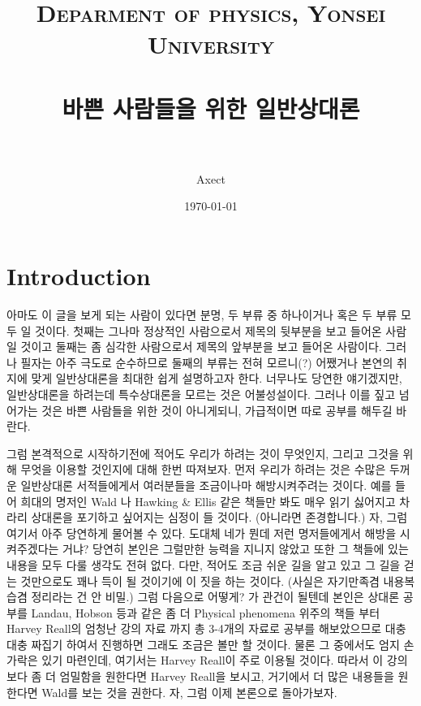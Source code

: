 \documentclass[final]{IEEEphot} %
\title{	
\normalsize 
\textsc{Deparment of physics, Yonsei University} \\ [25pt] %
\horrule{0.5pt} \\[0.4cm] %
\huge 바쁜 사람들을 위한 일반상대론\\ %
\horrule{2pt} \\[0.5cm] %
}
\author{Axect} %
\date{\normalsize\today} %
\numberwithin{equation}{section} %
\numberwithin{figure}{section} %
\numberwithin{table}{section} %
\theoremstyle{plain}
\newcommand{\HS}{\hspace{0.5cm}}
\begin{document}
\maketitle %


\section{Introduction}

\onehalfspacing
\HS 아마도 이 글을 보게 되는 사람이 있다면 분명, 두 부류 중 하나이거나 혹은 두 부류 모두 일 것이다. 첫째는 그나마 정상적인 사람으로서 제목의 뒷부분을 보고 들어온 사람일 것이고 둘째는 좀 심각한 사람으로서 제목의 앞부분을 보고 들어온 사람이다.
그러나 필자는 아주 극도로 순수하므로 둘째의 부류는 전혀 모르니(?) 어쨌거나 본연의 취지에 맞게 일반상대론을 최대한 쉽게 설명하고자 한다. \footnotemark
{}
너무나도 당연한 얘기겠지만, 일반상대론을 하려는데 특수상대론을 모르는 것은 어불성설이다. 그러나 이를 짚고 넘어가는 것은 바쁜 사람들을 위한 것이 아니게되니, 가급적이면 따로 공부를 해두길 바란다.\footnotemark
{}

\vspace{0.3cm}

\HS 그럼 본격적으로 시작하기전에 적어도 우리가 하려는 것이 무엇인지, 그리고 그것을 위해 무엇을 이용할 것인지에 대해 한번 따져보자. 먼저 우리가 하려는 것은 
수많은 두꺼운 일반상대론 서적들에게서 여러분들을 조금이나마 해방시켜주려는 것이다. 예를 들어 희대의 명저인 Wald 나 Hawking \& Ellis 같은 책들만 봐도 
매우 읽기 싫어지고 차라리 상대론을 포기하고 싶어지는 심정이 들 것이다. (아니라면 존경합니다.) 자, 그럼 여기서 아주 당연하게 물어볼 수 있다. 도대체 네가 뭔데 
저런 명저들에게서 해방을 시켜주겠다는 거냐? 당연히 본인은 그럴만한 능력을 지니지 않았고 또한 그 책들에 있는 내용을 모두 다룰 생각도 전혀 없다. 다만, 적어도 
조금 쉬운 길을 알고 있고 그 길을 걷는 것만으로도 꽤나 득이 될 것이기에 이 짓을 하는 것이다. (사실은 자기만족겸 내용복습겸 정리라는 건 안 비밀.)  그럼 다음으로 어떻게? 가 관건이 될텐데 본인은 상대론 공부를 Landau, Hobson
 등과 같은 좀 더 Physical phenomena 위주의 책들 부터 Harvey Reall의 엄청난 강의 자료 까지 총 3-4개의 자료로 공부를 해보았으므로 대충대충 짜집기 하여서 
 진행하면 그래도 조금은 볼만 할 것이다. 물론 그 중에서도 엄지 손가락은 있기 마련인데, 여기서는 Harvey Reall이 주로 이용될 것이다.\footnotemark
 따라서 이 강의보다 좀 더 엄밀함을 원한다면 Harvey Reall을 보시고, 거기에서 더 많은 내용들을 원한다면 Wald를 보는 것을 권한다. 자, 그럼 이제 본론으로 돌아가보자.
 
\end{document}
